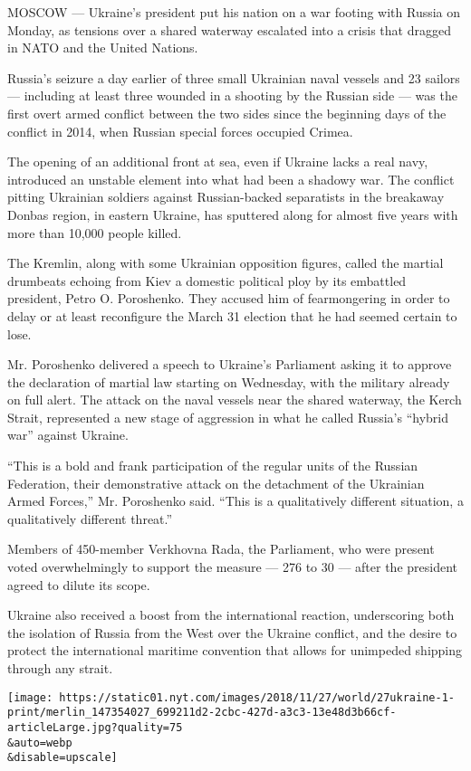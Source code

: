 MOSCOW --- Ukraine's president put his nation on a war footing with
Russia on Monday, as tensions over a shared waterway escalated into a
crisis that dragged in NATO and the United Nations.

Russia's seizure a day earlier of three small Ukrainian naval vessels
and 23 sailors --- including at least three wounded in a shooting by the
Russian side --- was the first overt armed conflict between the two
sides since the beginning days of the conflict in 2014, when Russian
special forces occupied Crimea.

The opening of an additional front at sea, even if Ukraine lacks a real
navy, introduced an unstable element into what had been a shadowy war.
The conflict pitting Ukrainian soldiers against Russian-backed
separatists in the breakaway Donbas region, in eastern Ukraine, has
sputtered along for almost five years with more than 10,000 people
killed.

The Kremlin, along with some Ukrainian opposition figures, called the
martial drumbeats echoing from Kiev a domestic political ploy by its
embattled president, Petro O. Poroshenko. They accused him of
fearmongering in order to delay or at least reconfigure the March 31
election that he had seemed certain to lose.

Mr. Poroshenko delivered a speech to Ukraine's Parliament asking it to
approve the declaration of martial law starting on Wednesday, with the
military already on full alert. The attack on the naval vessels near the
shared waterway, the Kerch Strait, represented a new stage of aggression
in what he called Russia's ``hybrid war'' against Ukraine.

``This is a bold and frank participation of the regular units of the
Russian Federation, their demonstrative attack on the detachment of the
Ukrainian Armed Forces,'' Mr. Poroshenko said. ``This is a qualitatively
different situation, a qualitatively different threat.''

Members of 450-member Verkhovna Rada, the Parliament, who were present
voted overwhelmingly to support the measure --- 276 to 30 --- after the
president agreed to dilute its scope.

Ukraine also received a boost from the international reaction,
underscoring both the isolation of Russia from the West over the Ukraine
conflict, and the desire to protect the international maritime
convention that allows for unimpeded shipping through any strait.

\texttt{[image: https://static01.nyt.com/images/2018/11/27/world/27ukraine-1-print/merlin\_147354027\_699211d2-2cbc-427d-a3c3-13e48d3b66cf-articleLarge.jpg?quality=75\\\&auto=webp\\\&disable=upscale]}

